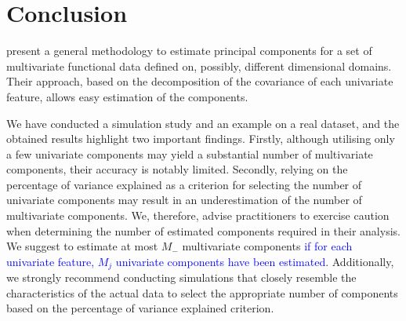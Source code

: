 
\section{Conclusion} %
\label{sec:conclusion}

\cite{happMultivariateFunctionalPrincipal2018} present a general methodology to estimate principal components for a set of multivariate functional data defined on, possibly, different dimensional domains. Their approach, based on the decomposition of the covariance of each univariate feature, allows easy estimation of the components.

We have conducted a simulation study and an example on a real dataset, and the obtained results highlight two important findings. Firstly, although utilising only a few univariate components may yield a substantial number of multivariate components, their accuracy is notably limited. Secondly, relying on the percentage of variance explained as a criterion for selecting the number of univariate components may result in an underestimation of the number of multivariate components. We, therefore, advise practitioners to exercise caution when determining the number of estimated components required in their analysis. We suggest to estimate at most $M_{-}$ multivariate components \textcolor{blue}{if for each univariate feature, $M_j$ univariate components have been estimated}. Additionally, we strongly recommend conducting simulations that closely resemble the characteristics of the actual data to select the appropriate number of components based on the percentage of variance explained criterion.







